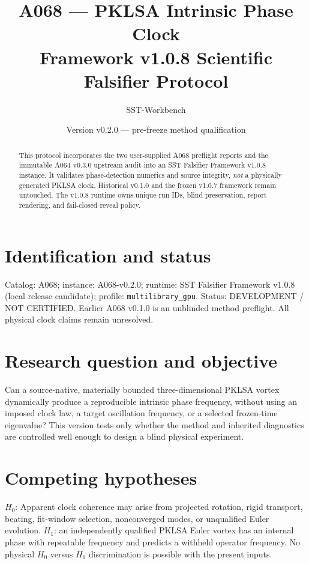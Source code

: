 \documentclass[11pt,a4paper]{article}
\title{A068 --- PKLSA Intrinsic Phase Clock\\Framework v1.0.8 Scientific Falsifier Protocol}
\author{SST-Workbench}
\date{Version v0.2.0 --- pre-freeze method qualification}
\begin{document}
\maketitle
\begin{abstract}
This protocol incorporates the two user-supplied A068 preflight reports and the immutable A064 v0.3.0 upstream audit into an SST Falsifier Framework v1.0.8 instance. It validates phase-detection numerics and source integrity, \emph{not} a physically generated PKLSA clock. Historical v0.1.0 and the frozen v1.0.7 framework remain untouched. The v1.0.8 runtime owns unique run IDs, blind preservation, report rendering, and fail-closed reveal policy.
\end{abstract}

\section{Identification and status}
Catalog: A068; instance: A068-v0.2.0; runtime: SST Falsifier Framework v1.0.8 (local release candidate); profile: \texttt{multilibrary\_gpu}. Status: DEVELOPMENT / NOT CERTIFIED. Earlier A068 v0.1.0 is an unblinded method preflight. All physical clock claims remain unresolved.

\section{Research question and objective}
Can a source-native, materially bounded three-dimensional PKLSA vortex dynamically produce a reproducible intrinsic phase frequency, without using an imposed clock law, a target oscillation frequency, or a selected frozen-time eigenvalue? This version tests only whether the method and inherited diagnostics are controlled well enough to design a blind physical experiment.

\section{Competing hypotheses}
$H_0$: Apparent clock coherence may arise from projected rotation, rigid transport, beating, fit-window selection, nonconverged modes, or unqualified Euler evolution. $H_1$: an independently qualified PKLSA Euler vortex has an internal phase with repeatable frequency and predicts a withheld operator frequency. No physical $H_0$ versus $H_1$ discrimination is possible with the present inputs.
\end{document}
